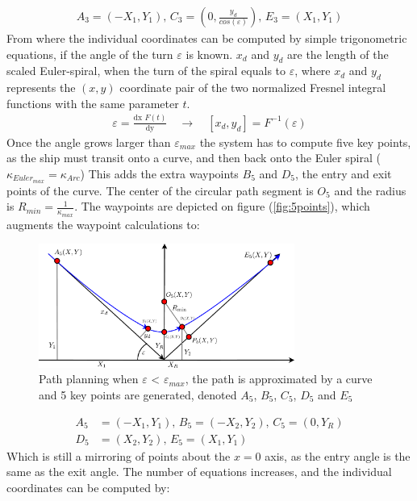 \documentclass{ifacconf}
\begin{document}
\begin{align}
A_3 = (-X_1,Y_1),\, C_3 = (0,\frac{y_d}{cos(\varepsilon)}),\, E_3 = (X_1,Y_1)
\end{align}
From where the individual coordinates can be computed by simple trigonometric equations, if the angle of the turn $\varepsilon$ is known. $x_d$ and $y_d$ are the length of the scaled Euler-spiral, when the turn of the spiral equals to $\varepsilon$, where $x_d$ and $y_d$ represents the $(x,y)$ coordinate pair of the two normalized Fresnel integral functions with the same parameter $t$. 
\begin{align}
\varepsilon = \frac{\textrm{dx }F(t)}{\textrm{dy}} \quad \to \quad [x_d,y_d] = F^{-1}(\varepsilon)
\end{align}
Once the angle grows larger than $\varepsilon_{max}$ the system has to compute five key points, as the ship must transit onto a curve, and then back onto the Euler spiral ($\kappa_{Euler_{max}} = \kappa_{Arc}$) This adds the extra waypoints $B_5$ and $D_5$, the entry and exit points of the curve. The center of the circular path segment is $O_5$ and the radius is $R_{min} = \frac{1}{\kappa_{max}}$. The waypoints are depicted on figure (\ref{fig:5points}), which augments the waypoint calculations to:
\begin{figure}
	\begin{center}
		\includegraphics[width=8.4cm]{img/5Points}    %
		\caption{Path planning when $\varepsilon$ < $\varepsilon_{max}$, the path is approximated by a curve and 5 key points are generated, denoted $A_5$, $B_5$, $C_5$, $D_5$ and $E_5$}  %
		\label{fig:3points}               
	\end{center}                                 %
\end{figure}
\begin{align}
A_5 &= (-X_1,Y_1),\, B_5 = (-X_2,Y_2),\, C_5 = (0,Y_R)\\
D_5 &= (X_2,Y_2),\, E_5 = (X_1,Y_1)
\end{align}
Which is still a mirroring of points about the $x=0$ axis, as the entry angle is the same as the exit angle. The number of equations increases, and the individual coordinates can be computed by:
\end{document}
